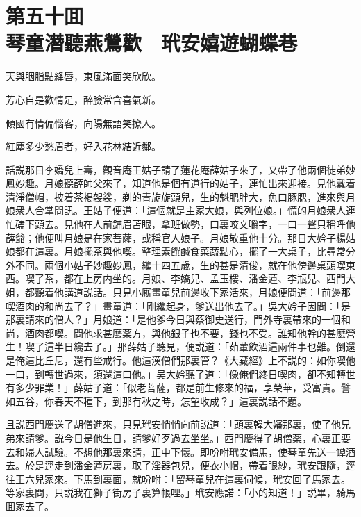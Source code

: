 
\chapter*{第五十囬　\\琴童潛聽燕鶯歡　玳安嬉遊蝴蝶巷}


\begin{myquote}
天與胭脂點絳唇，東風滿面笑欣欣。

芳心自是歡情足，醉臉常含喜氣新。

傾國有情偏惱客，向陽無語笑撩人。

紅塵多少愁眉者，好入花林結近鄰。
\end{myquote}

話説那日李嬌兒上壽，觀音庵王姑子請了蓮花庵薛姑子來了，又帶了他兩個徒弟妙鳳妙趣。月娘聽薛師父來了，知道他是個有道行的姑子，連忙出來迎接。見他戴着清淨僧帽，披着茶褐袈裟，剃的青旋旋頭兒，生的魁肥胖大，魚口豚腮，進來與月娘衆人合掌問訊。王姑子便道：「這個就是主家大娘，與列位娘。」慌的月娘衆人連忙磕下頭去。見他在人前鋪眉苫眼，拿班做勢，口裏咬文嚼字，一口一聲只稱呼他薛爺；他便叫月娘是在家菩薩，或稱官人娘子。月娘敬重他十分。那日大妗子楊姑娘都在這裏。月娘擺茶與他喫。整理素饌鹹食菜蔬點心，擺了一大桌子，比尋常分外不同。兩個小姑子妙趣妙鳳，纔十四五歲，生的甚是清俊，就在他傍邊桌頭喫東西。喫了茶，都在上房内坐的。月娘、李嬌兒、孟玉樓、潘金蓮、李瓶兒、西門大姐，都聽着他講道説話。只見小廝畫童兒前邊收下家活來，月娘便問道：「前邊那喫酒肉的和尚去了？」畫童道：「剛纔起身，爹送出他去了。」吳大妗子因問：「是那裏請來的僧人？」月娘道：「是他爹今日與蔡御史送行，門外寺裏帶來的一個和尚，酒肉都喫。問他求甚麽薬方，與他銀子也不要，錢也不受。誰知他幹的甚麽營生！喫了這半日纔去了。」那薛姑子聽見，便説道：「茹葷飲酒這兩件事也難。倒還是俺這比丘尼，還有些戒行。他這漢僧們那裏管？《大藏經》上不説的：如你喫他一口，到轉世過來，須還這口他。」吴大妗聽了道：「像俺們終日喫肉，卻不知轉世有多少罪業！」薛姑子道：「似老菩薩，都是前生修來的福，享榮華，受富貴。譬如五谷，你春天不種下，到那有秋之時，怎望收成？」這裏説話不題。

且説西門慶送了胡僧進來，只見玳安悄悄向前説道：「頭裏韓大嬸那裏，使了他兄弟來請爹。説今日是他生日，請爹好歹過去坐坐。」西門慶得了胡僧薬，心裏正要去和婦人試驗。不想他那裏來請，正中下懷。即吩咐玳安備馬，使琴童先送一罈酒去。於是逕走到潘金蓮房裏，取了淫器包兒，便衣小帽，帶着眼紗，玳安跟隨，逕往王六兒家來。下馬到裏面，就吩咐：「留琴童兒在這裏伺候，玳安回了馬家去。等家裏問，只説我在獅子街房子裏算帳哩。」玳安應諾：「小的知道！」説畢，騎馬囬家去了。

